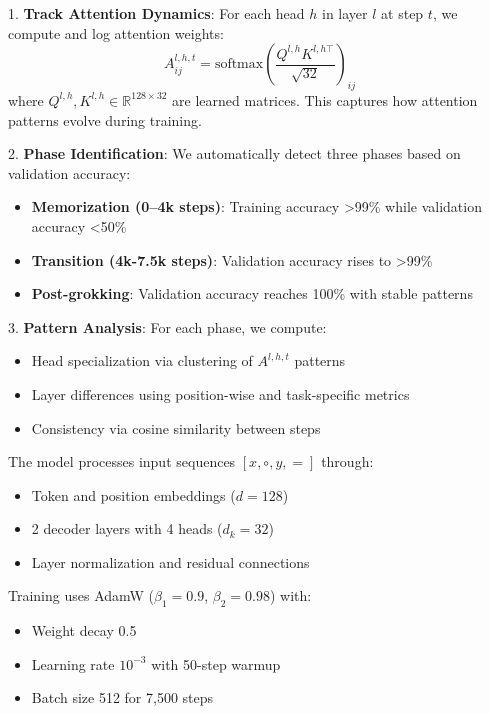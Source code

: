 \documentclass{article} %
\begin{document}
1. \textbf{Track Attention Dynamics}: For each head $h$ in layer $l$ at step $t$, we compute and log attention weights:
\begin{equation}
    A_{ij}^{l,h,t} = \text{softmax}\left(\frac{Q^{l,h}K^{l,h\top}}{\sqrt{32}}\right)_{ij}
\end{equation}
where $Q^{l,h}, K^{l,h} \in \mathbb{R}^{128 \times 32}$ are learned matrices. This captures how attention patterns evolve during training.

2. \textbf{Phase Identification}: We automatically detect three phases based on validation accuracy:
\begin{itemize}
    \item \textbf{Memorization (0--4k steps)}: Training accuracy >99\% while validation accuracy <50\%
    \item \textbf{Transition (4k-7.5k steps)}: Validation accuracy rises to >99\%
    \item \textbf{Post-grokking}: Validation accuracy reaches 100\% with stable patterns
\end{itemize}

3. \textbf{Pattern Analysis}: For each phase, we compute:
\begin{itemize}
    \item Head specialization via clustering of $A^{l,h,t}$ patterns
    \item Layer differences using position-wise and task-specific metrics
    \item Consistency via cosine similarity between steps
\end{itemize}

The model processes input sequences $[x, \circ, y, =]$ through:
\begin{itemize}
    \item Token and position embeddings ($d=128$)
    \item 2 decoder layers with 4 heads ($d_k=32$)
    \item Layer normalization and residual connections
\end{itemize}

Training uses AdamW ($\beta_1=0.9$, $\beta_2=0.98$) with:
\begin{itemize}
    \item Weight decay 0.5
    \item Learning rate $10^{-3}$ with 50-step warmup
    \item Batch size 512 for 7,500 steps
\end{itemize}
\end{document}

